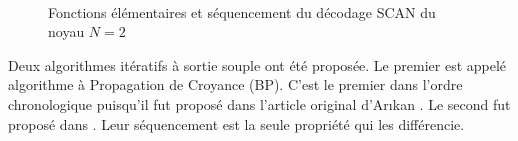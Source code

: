 \begin{figure}[t]
  \renewcommand*\thesubfigure{\arabic{subfigure}} 
  \centering
  \hspace{2.5cm}
  \\
  \hspace{0.5cm}
  \hspace{3.7cm}
  \caption{Fonctions élémentaires et séquencement du décodage SCAN du noyau $N=2$}
  \label{fig:SCANSchedule}
\end{figure}

Deux algorithmes itératifs à sortie souple ont été proposée. Le premier est appelé algorithme à Propagation de Croyance (BP). C'est le premier dans l'ordre chronologique puisqu'il fut proposé dans l'article original d'Ar{\i}kan \cite{arikan_channel_2009}. Le second fut proposé dans \cite{fayyaz_low-complexity_2014}. Leur séquencement est la seule propriété qui les différencie.

